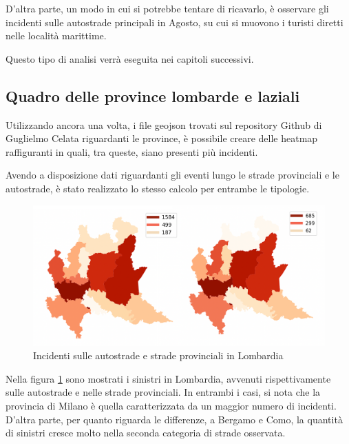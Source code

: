 \documentclass[a4paper,12pt]{report}
\begin{document}
D'altra parte, un modo in cui si potrebbe tentare di ricavarlo, è osservare gli 
incidenti sulle autostrade principali in Agosto, su cui si muovono i turisti diretti 
nelle località marittime. 

Questo tipo di analisi verrà eseguita nei capitoli successivi. 

\subsection{Quadro delle province lombarde e laziali}

Utilizzando ancora una volta, i file geojson trovati sul repository Github di 
Guglielmo Celata riguardanti le province, 
è possibile creare delle heatmap raffiguranti in quali, tra queste, siano 
presenti più incidenti. 

Avendo a disposizione dati riguardanti gli eventi lungo le strade provinciali e le autostrade, 
è stato realizzato lo stesso calcolo per entrambe le tipologie. 

\begin{figure}
    \includegraphics[width=\linewidth]{img_unite/lombardia_autostrade_provinciali.png}
    \caption{Incidenti sulle autostrade e strade provinciali in Lombardia}
    \label{fig:lombardia-strade}
\end{figure}

Nella figura \ref{fig:lombardia-strade} sono mostrati i sinistri in Lombardia, 
avvenuti rispettivamente sulle autostrade e nelle strade provinciali. 
In entrambi i casi, si nota che la provincia di Milano è quella caratterizzata da 
un maggior numero di incidenti. 
D'altra parte, per quanto riguarda le differenze, a Bergamo e Como, 
la quantità di sinistri cresce molto nella seconda categoria di strade osservata. 
\end{document}
